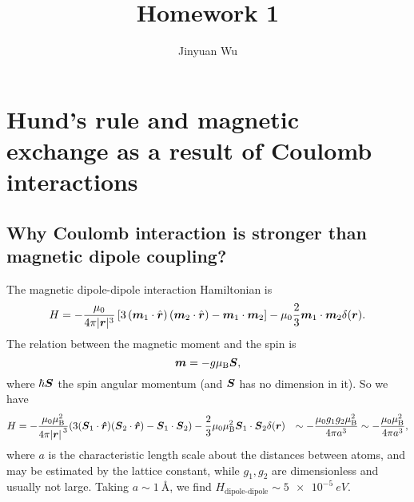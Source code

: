 \documentclass[hyperref, a4paper]{article}
\title{Homework 1}
\author{Jinyuan Wu}
\def\\{}%
\newcommand*{\muB}{\mu_{\text{B}}}
\begin{document}
\maketitle

\section{Hund’s rule and magnetic exchange as a result of Coulomb interactions}

\subsection{Why Coulomb interaction is stronger than magnetic dipole coupling?}\label{sec:hund.magnitude}

The magnetic dipole-dipole interaction Hamiltonian is 
\begin{equation}
    H=-\frac{\mu_0}{4 \pi|\vb*{r}|^3}\left[3\left(\vb*{m}_1 \cdot \hat{\vb*{r}}\right)\left(\vb*{m}_2 \cdot \hat{\vb*{r}}\right)-\vb*{m}_1 \cdot \vb*{m}_2\right]-\mu_0 \frac{2}{3} \vb*{m}_1 \cdot \vb*{m}_2 \delta(\vb*{r}).
\end{equation}
The relation between the magnetic moment and the spin is 
\begin{equation}
    \vb*{m} = - g \muB \vb*{S},
\end{equation}
where $\hbar \vb*{S}$ the spin angular momentum 
(and $\vb*{S}$ has no dimension in it).
So we have 
\begin{equation}
    \begin{aligned}
        H &= - \frac{\mu_0 \muB^2}{4 \pi \abs*{\vb*{r}}^3} 
        (3 (\vb*{S}_1 \cdot \vu*{r}) (\vb*{S}_2 \cdot \vu*{r}) - \vb*{S}_1 \cdot \vb*{S}_2) 
        - \frac{2}{3} \mu_0 \muB^2 \vb*{S}_1 \cdot \vb*{S}_2 \delta(\vb*{r}) \\
        &\sim - \frac{\mu_0 g_1 g_2 \muB^2}{4 \pi a^3} \sim - \frac{\mu_0 \muB^2}{4 \pi a^3},
    \end{aligned}
\end{equation}
where $a$ is the characteristic length scale 
about the distances between atoms,
and may be estimated by the lattice constant,
while $g_1, g_2$ are dimensionless and usually not large. 
Taking $a \sim \SI{1}{\angstrom}$,
we find $H_{\text{dipole-dipole}} \sim \SI{5e-5}{eV}$.
\end{document}
